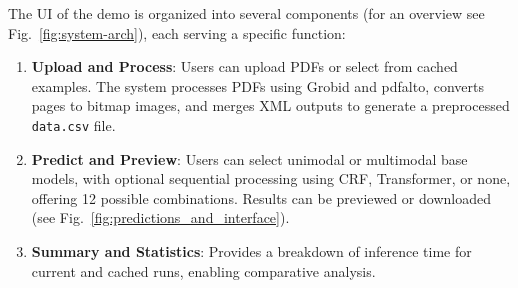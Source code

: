 \documentclass[runningheads]{llncs}
\begin{document}
The UI of the demo is organized into several components (for an overview
see Fig.~\ref{fig:system-arch}), each serving a specific function:

\begin{enumerate}
	\item \textbf{Upload and Process}: Users can upload PDFs or select from cached examples. The system processes PDFs using Grobid and pdfalto, converts pages to bitmap images, and merges XML outputs to generate a preprocessed \texttt{data.csv} file.

	\item \textbf{Predict and Preview}: Users can select unimodal or multimodal base models, with optional sequential processing using CRF, Transformer, or none, offering 12 possible combinations. Results can be previewed or downloaded (see Fig.~\ref{fig:predictions_and_interface}).

	\item \textbf{Summary and Statistics}: Provides a breakdown of inference time for current and cached runs, enabling comparative analysis.
\end{enumerate}
\end{document}
